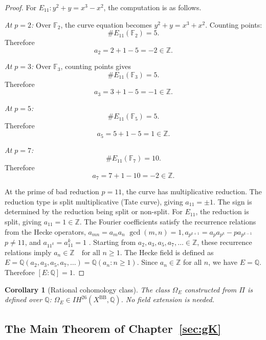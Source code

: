 \documentclass[12pt]{amsart}
\newtheorem{corollary}[theorem]{Corollary}
\theoremstyle{definition}
\newcommand{\Q}{\mathbb{Q}}
\newcommand{\Z}{\mathbb{Z}}
\newcommand{\IH}{\mathit{IH}}
\begin{document}
\begin{proof}
For $E_{11}: y^2 + y = x^3 - x^2$, the computation is as follows.

\textit{At $p = 2$:}
Over $\mathbb{F}_2$, the curve equation becomes $y^2 + y = x^3 + x^2$. Counting points:
$$\#E_{11}(\mathbb{F}_2) = 5.$$
Therefore
$$a_2 = 2 + 1 - 5 = -2 \in \Z.$$

\textit{At $p = 3$:}
Over $\mathbb{F}_3$, counting points gives
$$\#E_{11}(\mathbb{F}_3) = 5.$$
Therefore
$$a_3 = 3 + 1 - 5 = -1 \in \Z.$$

\textit{At $p = 5$:}
$$\#E_{11}(\mathbb{F}_5) = 5.$$
Therefore
$$a_5 = 5 + 1 - 5 = 1 \in \Z.$$

\textit{At $p = 7$:}
$$\#E_{11}(\mathbb{F}_7) = 10.$$
Therefore
$$a_7 = 7 + 1 - 10 = -2 \in \Z. $$

At the prime of bad reduction $p = 11$, the curve has multiplicative reduction. The reduction type is split multiplicative (Tate curve), giving $a_{11} = \pm 1$.
The sign is determined by the reduction being split or non-split. For $E_{11}$, the reduction is split, giving
$a_{11} = 1 \in \Z$.
The Fourier coefficients satisfy the recurrence relations from the Hecke operators, $a_{mn} = a_m a_n$  $\gcd(m,n) = 1, a_{p^{k+1}} = a_p a_{p^k} - p a_{p^{k-1}}$   $p \neq 11$, and 
$a_{11^k} = a_{11}^k = 1$ . Starting from $a_2, a_3, a_5, a_7, \ldots \in \Z$, these recurrence relations imply
$a_n \in \Z \quad \text{for all } n \geq 1$. The Hecke field is defined as
$E = \Q(a_2, a_3, a_5, a_7, \ldots) = \Q(a_n : n \geq 1)$. Since $a_n \in \Z$ for all $n$, we have
$E = \Q$. Therefore $[E : \Q] = 1$.
\end{proof}


\begin{corollary}[Rational cohomology class]
The class $\Omega_E$ constructed from $\Pi$ is defined over $\Q$: $\Omega_E \in \IH^{26}(X^{\mathrm{BB}}, \Q)$. No field extension is needed.
\end{corollary}

\subsection{The Main Theorem of Chapter~\ref{sec:gK}}
\end{document}

